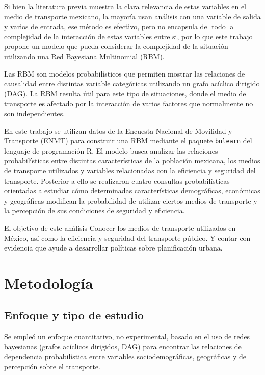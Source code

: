 \documentclass[
  letterpaper,
  DIV=11,
  numbers=noendperiod]{scrartcl}
\begin{document}
Si bien la literatura previa muestra la clara relevancia de estas 
variables en el medio de transporte mexicano, la mayoría usan análisis
con una variable de salida y varios de entrada, ese método es efectivo, 
pero no encapsula del todo la complejidad de la interacción de estas 
variables entre si, por lo que este trabajo propone un modelo que 
pueda considerar la complejidad de la situación utilizando una Red Bayesiana 
Multinomial (RBM).

Las RBM son modelos probabilísticos que permiten mostrar las relaciones 
de causalidad entre distintas variable categóricas utilizando un 
grafo acíclico dirigido (DAG). La RBM resulta útil para este 
tipo de situaciones, donde el medio de transporte es afectado por 
la interacción de varios factores que normalmente no son independientes.

En este trabajo se utilizan datos de la Encuesta Nacional de Movilidad y Transporte (ENMT) 
para construir una RBM mediante el paquete \texttt{bnlearn} 
del lenguaje de programación R. El modelo busca analizar las relaciones probabilísticas 
entre distintas características de la población mexicana, los medios de transporte 
utilizados y variables relacionadas con la eficiencia y seguridad del transporte. 
Posterior a ello se realizaron cuatro consultas probabilísticas orientadas 
a estudiar cómo determinadas características demográficas, económicas y geográficas 
modifican la probabilidad de utilizar ciertos medios de transporte y la percepción 
de sus condiciones de seguridad y eficiencia.

El objetivo de este análisis Conocer los medios de transporte utilizados en México, 
así como la eficiencia y seguridad del transporte público. Y contar con evidencia 
que ayude a desarrollar políticas sobre planificación urbana.

\section{Metodología}\label{Metodología}


\subsection{Enfoque y tipo de estudio}
Se empleó un enfoque cuantitativo, no experimental, basado en el uso de redes bayesianas (grafos acíclicos dirigidos, DAG) para encontrar las relaciones de dependencia probabilística entre variables sociodemográficas, geográficas y de percepción sobre el transporte.
\end{document}
